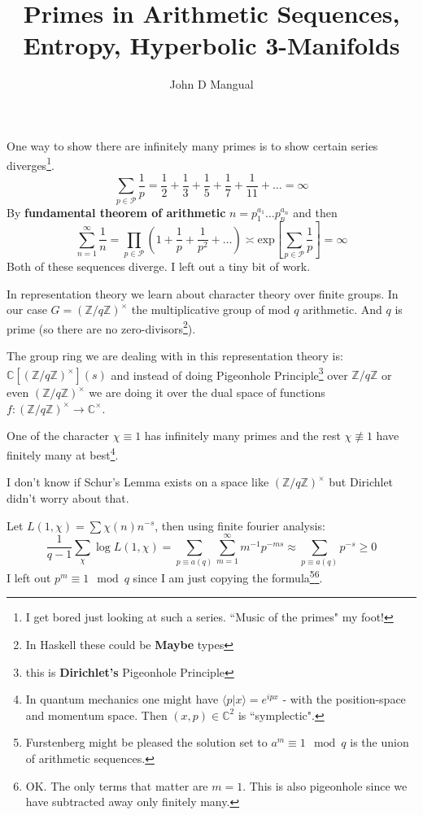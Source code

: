 \documentclass[12pt]{article}
\title{\textbf{ Primes in Arithmetic Sequences, Entropy, Hyperbolic 3-Manifolds }}
\author{John D Mangual}
\date{}
\begin{document}
\selectfont \fontsize{25}{30}\selectfont

\maketitle

\noindent One way to show there are infinitely many primes is to show certain series diverges\footnote{I get bored just looking at such a series. ``Music of the primes" my foot!}.
$$ \sum_{p \in \mathcal{P} }\frac{1}{p}
= \frac{1}{2} + \frac{1}{3} 
+ \frac{1}{5} + \frac{1}{7}+ \frac{1}{11} + \dots = \infty $$
By \textbf {\color{red}fundamental theorem of arithmetic} $n = p_1^{a_1}\dots p_n^{a_n}$ and then
$$ \sum_{n=1}^\infty \frac{1}{n}= \prod_{p \in \mathcal{P}} ( 1 + \frac{1}{p} + \frac{1}{p^2} + \dots ) \asymp \mathrm{exp} \left[\sum_{p \in \mathcal{P}} \frac{1}{p} \right] = \infty$$
Both of these sequences diverge. I left out a tiny bit of work.
\newpage

\noindent In representation theory we learn about character theory over finite groups.  In our case $G = (\mathbb{Z}/q\mathbb{Z})^\times$ the multiplicative group of mod $q$ arithmetic.  And $q$ is prime (so there are no zero-divisors\footnote{In Haskell these could be \textbf{Maybe} types}). \newline

\noindent The group ring we are dealing with in this representation theory is: $\mathbb{C}[(\mathbb{Z}/q\mathbb{Z})^\times](s) $ and instead of doing Pigeonhole Principle\footnote{this is \textbf{Dirichlet's} Pigeonhole Principle} over $\mathbb{Z}/q\mathbb{Z}$ or even $(\mathbb{Z}/q\mathbb{Z})^\times$ we are doing it over the dual space of functions $f:(\mathbb{Z}/q\mathbb{Z})^\times \to \mathbb{C}^\times$. \newline

\noindent One of the character $\chi \equiv 1$ has infinitely many primes and the rest $\chi \not \equiv 1$ have finitely many at best\footnote{In quantum mechanics one might have $\langle p | x\rangle = e^{ipx}$ - with the position-space and momentum space.  Then $(x,p)\in \mathbb{C}^2$ is ``symplectic".}. \newline

\noindent I don't know if Schur's Lemma exists on a space like $(\mathbb{Z}/q\mathbb{Z})^\times $ but Dirichlet didn't worry about that.

\newpage

\noindent Let $L(1,\chi) = \sum \chi(n) n^{-s}$, then using finite fourier analysis:
$$ \frac{1}{q-1}\sum_\chi \log L(1, \chi)
= \sum_{p \equiv a(q)} \sum_{m=1}^\infty m^{-1} p^{-ms} 
\approx \sum_{p \equiv a(q)}  p^{-s}  \geq 0$$
I left out $p^m \equiv 1 \mod q$ since I am just copying the formula\footnote{Furstenberg might be pleased the solution set to $a^m \equiv 1 \mod q$ is the union of arithmetic sequences.}\footnote{OK.  The only terms that matter are $m = 1$.  This is also pigeonhole since we have subtracted away only finitely many.}. \newline
\end{document}
